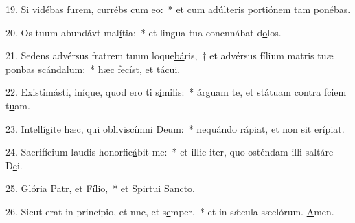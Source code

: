 19. Si vidébas furem, currébs cum \uline{e}o:~* et cum adúlteris portiónem tam pon\uline{é}bas.\par 
20. Os tuum abundávt mal\uline{í}tia:~* et lingua tua concnnábat d\uline{o}los.\par 
21. Sedens advérsus fratrem tuum loque\uline{bá}ris,~† et advérsus fílium matris tuæ ponbas sc\uline{á}ndalum:~* hæc fecíst, et tác\uline{u}i.\par 
22. Existimásti, iníque, quod ero ti s\uline{í}milis:~* árguam te, et státuam contra fciem t\uline{u}am.\par 
23. Intellígite hæc, qui obliviscímni D\uline{e}um:~* nequándo rápiat, et non sit  eríp\uline{i}at.\par 
24. Sacrifícium laudis honorfic\uline{á}bit me:~* et illic iter, quo osténdam illi saltáre D\uline{e}i.\par 
25. Glória Patr, et F\uline{í}lio,~* et Spirtui S\uline{a}ncto.\par 
26. Sicut erat in princípio, et nnc, et s\uline{e}mper,~* et in sǽcula sæclórum. \uline{A}men.\par 
